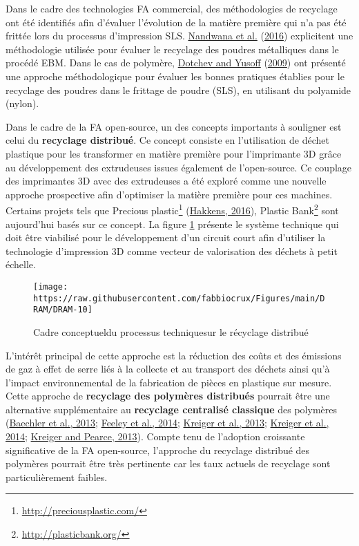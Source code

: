 \documentclass[
]{article}
\begin{document}
Dans le cadre des technologies FA commercial, des méthodologies de recyclage ont été identifiés afin d'évaluer l'évolution de la matière première qui n'a pas été frittée lors du processus d'impression SLS.
\protect\hyperlink{ref-Raugel2015}{Nandwana et al.} (\protect\hyperlink{ref-Raugel2015}{2016}) explicitent une méthodologie utilisée pour évaluer le recyclage des poudres métalliques dans le procédé EBM.
Dans le cas de polymère, \protect\hyperlink{ref-Dotchev2009}{Dotchev and Yusoff} (\protect\hyperlink{ref-Dotchev2009}{2009}) ont présenté une approche méthodologique pour évaluer les bonnes pratiques établies pour le recyclage des poudres dans le frittage de poudre (SLS), en utilisant du polyamide (nylon).

Dans le cadre de la FA open-source, un des concepts importants à souligner est celui du \textbf{recyclage distribué}.
Ce concept consiste en l'utilisation de déchet plastique pour les transformer en matière première pour l'imprimante 3D grâce au développement des extrudeuses issues également de l'open-source. Ce couplage des imprimantes 3D avec des extrudeuses a été exploré comme une nouvelle approche prospective afin d'optimiser la matière première pour ces machines.
Certains projets tels que Precious plastic\footnote{\protect\hyperlink{http:ux2fux2fpreciousplastic.comux2f}{http://preciousplastic.com/}} (\protect\hyperlink{ref-Hakkens2016}{Hakkens, 2016}), Plastic Bank\footnote{\protect\hyperlink{http:ux2fux2fplasticbank.orgux2f}{http://plasticbank.org/}} sont aujourd'hui basés sur ce concept.
La figure \ref{fig:slr-methodology} présente le système technique qui doit être viabilisé pour le développement d'un circuit court afin d'utiliser la technologie d'impression 3D comme vecteur de valorisation des déchets à petit échelle.

\begin{figure}

{\centering \texttt{[image: https://raw.githubusercontent.com/fabbiocrux/Figures/main/DRAM/DRAM-10]} 

}

\caption{Cadre conceptueldu processus techniquesur le récyclage distribué }\label{fig:slr-methodology}
\end{figure}

L'intérêt principal de cette approche est la réduction des coûts et des émissions de gaz à effet de serre liés à la collecte et au transport des déchets ainsi qu'à l'impact environnemental de la fabrication de pièces en plastique sur mesure.\\
Cette approche de \textbf{recyclage des polymères distribués} pourrait être une alternative supplémentaire au \textbf{recyclage centralisé classique} des polymères (\protect\hyperlink{ref-Baechler2013}{Baechler et al., 2013}; \protect\hyperlink{ref-Feeley2014}{Feeley et al., 2014}; \protect\hyperlink{ref-Anzalone2013}{Kreiger et al., 2013}; \protect\hyperlink{ref-Kreiger2014}{Kreiger et al., 2014}; \protect\hyperlink{ref-Kreiger2013}{Kreiger and Pearce, 2013}).
Compte tenu de l'adoption croissante significative de la FA open-source, l'approche du recyclage distribué des polymères pourrait être très pertinente car les taux actuels de recyclage sont particulièrement faibles.
\end{document}
